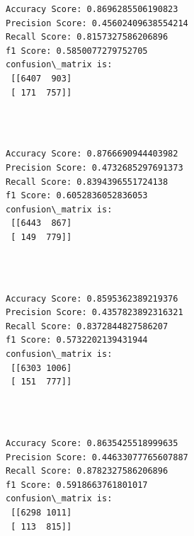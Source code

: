 \documentclass[11pt]{article}
\begin{document}
    \begin{Verbatim}[commandchars=\\\{\}]
Accuracy Score: 0.8696285506190823
Precision Score: 0.45602409638554214
Recall Score: 0.8157327586206896
f1 Score: 0.5850077279752705
confusion\_matrix is: 
 [[6407  903]
 [ 171  757]] 


    \end{Verbatim}

   

    \begin{center}
    \end{center}
    { \hspace*{\fill} \\}
    
    \begin{Verbatim}[commandchars=\\\{\}]
Accuracy Score: 0.8766690944403982
Precision Score: 0.4732685297691373
Recall Score: 0.8394396551724138
f1 Score: 0.6052836052836053
confusion\_matrix is: 
 [[6443  867]
 [ 149  779]] 


    \end{Verbatim}

    

    \begin{center}
    \end{center}
    { \hspace*{\fill} \\}
    
   

    \begin{Verbatim}[commandchars=\\\{\}]
Accuracy Score: 0.8595362389219376
Precision Score: 0.4357823892316321
Recall Score: 0.8372844827586207
f1 Score: 0.5732202139431944
confusion\_matrix is: 
 [[6303 1006]
 [ 151  777]] 


    \end{Verbatim}

    \begin{center}
    \end{center}
    { \hspace*{\fill} \\}
    
    \begin{Verbatim}[commandchars=\\\{\}]
Accuracy Score: 0.8635425518999635
Precision Score: 0.44633077765607887
Recall Score: 0.8782327586206896
f1 Score: 0.5918663761801017
confusion\_matrix is: 
 [[6298 1011]
 [ 113  815]] 


    \end{Verbatim}
\end{document}
